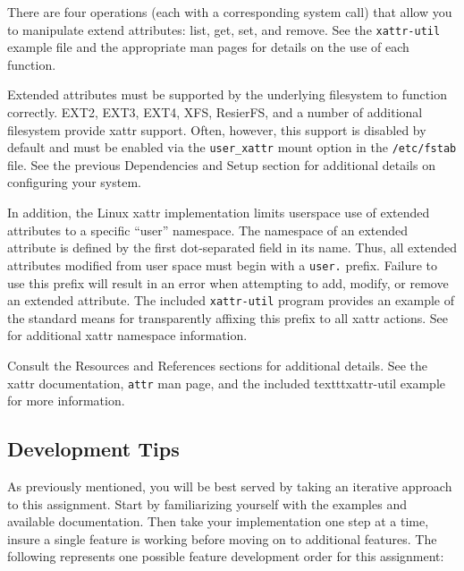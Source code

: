 \documentclass[12pt]{article}
\begin{document}
There are four operations (each with a corresponding system call) that
allow you to manipulate extend attributes: list, get, set, and
remove. See the \texttt{xattr-util} example file and the appropriate man
pages for details on the use of each function.

Extended attributes must be supported by the underlying filesystem to
function correctly. EXT2, EXT3, EXT4, XFS, ResierFS, and a number of
additional filesystem provide xattr support. Often, however, this
support is disabled by default and must be enabled via the
\texttt{user\_xattr} mount option in the \texttt{/etc/fstab} file. See
the previous Dependencies and Setup section for additional details on
configuring your system.

In addition, the Linux xattr implementation limits userspace use of
extended attributes to a specific ``user'' namespace. The namespace of an
extended attribute is defined by the first dot-separated field in its
name. Thus, all extended attributes modified from user space must begin
with a \texttt{user.} prefix. Failure to use this prefix will result in
an error when attempting to add, modify, or remove an extended
attribute. The included \texttt{xattr-util} program provides an
example of the standard means for transparently affixing this prefix
to all xattr actions. See \cite{freedesktop-xattr} for additional
xattr namespace information.

Consult the Resources and References sections for additional
details. See the xattr documentation, \texttt{attr} man page, and the included
texttt{xattr-util} example for more information.

\subsection{Development Tips}

As previously mentioned, you will be best served by taking an iterative
approach to this assignment. Start by familiarizing yourself with the
examples and available documentation. Then take your implementation one
step at a time, insure a single feature is working before moving on to
additional features. The following represents one possible feature development
order for this assignment:
\end{document}
